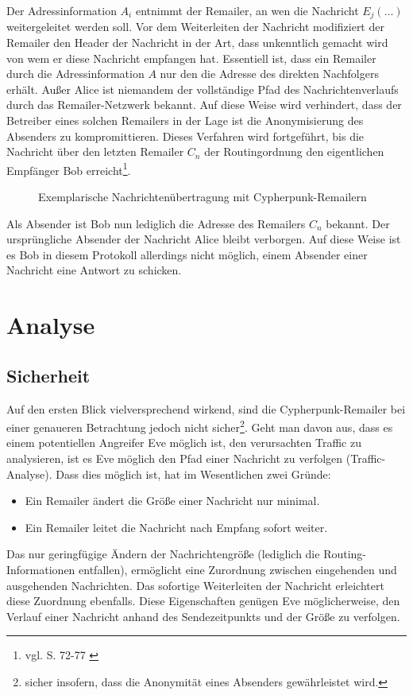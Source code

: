 Der Adressinformation \(A_i\) entnimmt der Remailer, an wen die Nachricht \(E_j(...)\) weitergeleitet werden soll. Vor dem Weiterleiten der Nachricht modifiziert der Remailer den Header der Nachricht in der Art, dass unkenntlich gemacht wird von wem er diese Nachricht empfangen hat. Essentiell ist, dass ein Remailer durch die Adressinformation \(A\) nur den die Adresse des direkten Nachfolgers erhält. Außer Alice ist niemandem der vollständige Pfad des Nachrichtenverlaufs durch das Remailer-Netzwerk bekannt. Auf diese Weise wird verhindert, dass der Betreiber eines solchen Remailers in der Lage ist die Anonymisierung des Absenders zu kompromittieren. Dieses Verfahren wird fortgeführt, bis die Nachricht über den letzten Remailer \(C_n\) der Routingordnung den eigentlichen Empfänger Bob erreicht\footnote{vgl. S. 72-77 \cite{kubieziel2007anonym}}.

\begin{figure}
	\begin{center}
		\def\svgwidth{0.8 \linewidth}
		
		\caption{Exemplarische Nachrichtenübertragung mit Cypherpunk-Remailern}
	\end{center}
\end{figure}

Als Absender ist Bob nun lediglich die Adresse des Remailers \(C_n\) bekannt. Der ursprüngliche Absender der Nachricht Alice bleibt verborgen. Auf diese Weise ist es Bob in diesem Protokoll allerdings nicht möglich, einem Absender einer Nachricht eine Antwort zu schicken.

\section{Analyse}
\subsection{Sicherheit}
Auf den ersten Blick vielversprechend wirkend, sind die Cypherpunk-Remailer bei einer genaueren Betrachtung jedoch nicht sicher\footnote{sicher insofern, dass die Anonymität eines Absenders gewährleistet wird.}. Geht man davon aus, dass es einem potentiellen Angreifer Eve möglich ist, den verursachten Traffic zu analysieren, ist es Eve möglich den Pfad einer Nachricht zu verfolgen (Traffic-Analyse). Dass dies möglich ist, hat im Wesentlichen zwei Gründe: 
\begin{itemize}
\item Ein Remailer ändert die Größe einer Nachricht nur minimal.
\item Ein Remailer leitet die Nachricht nach Empfang sofort weiter.
\end{itemize} 
Das nur geringfügige Ändern der Nachrichtengröße (lediglich die Routing-Informationen entfallen), ermöglicht eine Zurordnung zwischen eingehenden und ausgehenden Nachrichten. Das sofortige Weiterleiten der Nachricht erleichtert diese Zuordnung ebenfalls. Diese Eigenschaften genügen Eve möglicherweise, den Verlauf einer Nachricht anhand des Sendezeitpunkts und der Größe zu verfolgen.


